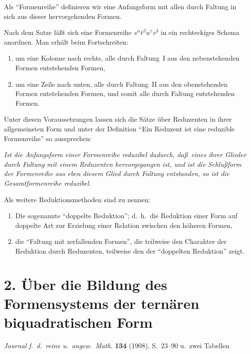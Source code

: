 \documentclass[11pt,a4paper]{article}
\theoremstyle{plain}
\theoremstyle{definition}
\begin{document}
Als ``Formenreihe'' definieren wir eine Anfangsform mit allen durch Faltung in sich aus dieser hervorgehenden Formen.

Nach dem Satze l\"a\ss t sich eine Formenreihe $s^\alpha t^\beta u^\gamma v^\delta$ in ein rechteckiges Schema anordnen. Man erh\"alt beim Fortschreiten:
\begin{enumerate}[label=\arabic*.]
\item um eine Kolonne nach rechts, alle durch Faltung~I aus den nebenstehenden Formen entstehenden Formen,
\item um eine Zeile nach unten, alle durch Faltung~II aus den obenstehenden Formen entstehenden Formen, und somit alle durch Faltung entstehenden Formen.
\end{enumerate}

Unter diesen Voraussetzungen lassen sich die S\"atze \"uber Reduzenten in ihrer allgemeinsten Form und unter der Definition ``Ein Reduzent ist eine reduzible Formenreihe'' so aussprechen:

\textit{Ist die Anfangsform einer Formenreihe reduzibel dadurch, da\ss\ eines ihrer Glieder durch Faltung mit einem Reduzenten hervorgegangen ist, und ist die Schlu\ss form der Formenreihe aus eben diesem Glied durch Faltung entstanden, so ist die Gesamtformenreihe reduzibel.}

Als weitere Reduktionsmethoden sind zu nennen:
\begin{enumerate}[label=\arabic*.]
\item Die sogenannte ``doppelte Reduktion''; d.~h.~die Reduktion einer Form auf doppelte Art zur Erzielung einer Relation zwischen den h\"oheren Formen,
\item die ``Faltung mit zerfallenden Formen'', die teilweise den Charakter der Reduktion durch Reduzenten, teilweise den der ``doppelten Reduktion'' zeigt.
\end{enumerate}
\clearpage


\section*{2. \"Uber die Bildung des Formensystems der tern\"aren biquadratischen Form}

\begin{center}
\textit{Journal f.~d.~reine u.~angew.~Math.} \textbf{134} (1908), S.~23--90 u.~zwei Tabellen
\end{center}
\end{document}
